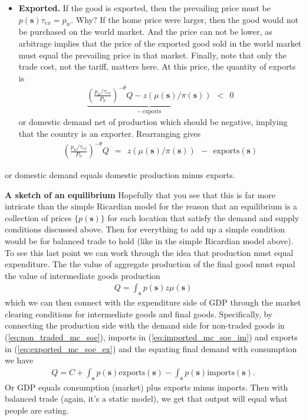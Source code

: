 \documentclass[pdftex,12pt]{article}
\begin{document}
\begin{itemize}
\item \textbf{Exported.} If the good is exported, then the prevailing price must be $p(\textbf{s})\tau_{ex} = p_w$. Why? If the home price were larger, then the good would not be purchased on the world market. And the price can not be lower, as arbitrage implies that the price of the exported good sold in the world market must equal the prevailing price in that market. Finally, note that only the trade cost, not the tariff, matters here. At this price, the quantity of exports is
    \begin{align}
 \underbrace{  \left(\frac{p_w/\tau_{ex}}{P_h}\right)^{-\theta}Q- z\left( \mu(\textbf{s}) / \pi(\textbf{s})\right)}_{- \ \mbox{exports}} \ \ < \ \ 0
 \label{eq:exported_mc_soe}
    \end{align}
    or domestic demand net of production which should be negative, implying that the country is an exporter. Rearranging gives
    \begin{align}
 \left(\frac{p_w/\tau_{ex}}{P_h}\right)^{-\theta}Q \ \ = \ \  z\left( \mu(\textbf{s}) / \pi(\textbf{s})\right)  \ \ - \ \  \mbox{exports}(\textbf{s})
 \label{eq:exported_mc_soe_ex}
    \end{align}
\end{itemize}
or domestic demand equals domestic production minus exports.

\medskip
\noindent \textbf{A sketch of an equilibrium} Hopefully that you see that this is far more intricate than the simple Ricardian model for the reason that an equilibrium is a collection of prices $\{ p(\textbf{s})\}$ for each location that satisfy the demand and supply conditions discussed above. Then for everything to add up a simple condition would be for balanced trade to hold (like in the simple Ricardian model above). To see this last point we can work through the idea that production must equal expenditure. The the value of aggregate production of the final good must equal the value of intermediate goods production
\begin{align}
    Q = \int_{\textbf{s}} p(\textbf{s})z \mu(\textbf{s})
\end{align}
which we can then connect with the expenditure side of GDP through the market clearing conditions for intermediate goods and final goods. Specifically, by connecting the production side with the demand side for non-traded goods in (\ref{eq:non_traded_mc_soe}), imports in (\ref{eq:imported_mc_soe_im}) and exports in  (\ref{eq:exported_mc_soe_ex}) and the equating final demand with consumption we have
\begin{align}
    Q = C +  \int_{\textbf{s}}p(\textbf{s})\mbox{exports}(\textbf{s}) - \int_{\textbf{s}}p(\textbf{s})\mbox{imports}(\textbf{s}).
\label{eq:production_side_gdp}
\end{align}
Or GDP equals consumption (market) plus exports minus imports. Then with balanced trade (again, it's a static model), we get that output will equal what people are eating.
\end{document}
